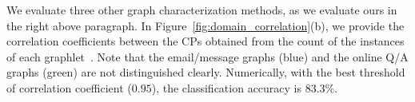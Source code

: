 








 We evaluate three other graph characterization methods, as we evaluate ours in the right above paragraph.
In Figure~\ref{fig:domain_correlation}(b), we provide the correlation coefficients between the CPs obtained from the count of the instances of each graphlet~\cite{milo2004superfamilies}. 
Note that the email/message graphs (blue) and the online Q/A graphs (green) are not distinguished clearly. Numerically, with the best threshold of correlation coefficient ($0.95$), the classification accuracy is $83.3\%$.

